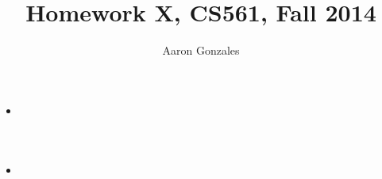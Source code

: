 \documentclass[titlepage]{article}\usepackage[]{graphicx}\usepackage[]{color}
\begin{document}
\title{Homework X, CS561, Fall 2014}
\author{Aaron Gonzales}
\maketitle


\section{}
\begin{quote}
  \textbf{}
\end{quote}

\begin{itemize}
  \item \textbf{}
  \item \textbf{ }
\end{itemize}
\end{document}
